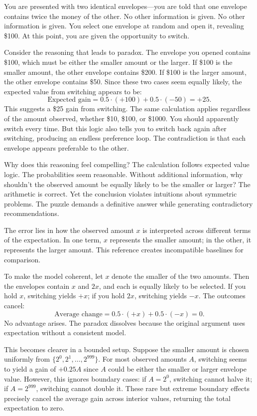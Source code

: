 You are presented with two identical envelopes—you are told that one envelope contains twice the money of the other. No other information is given. No other information is given. You select one envelope at random and open it, revealing \$100. At this point, you are given the opportunity to switch.

Consider the reasoning that leads to paradox. The envelope you opened contains \$100, which must be either the smaller amount or the larger. If \$100 is the smaller amount, the other envelope contains \$200. If \$100 is the larger amount, the other envelope contains \$50. Since these two cases seem equally likely, the expected value from switching appears to be:
\[
\text{Expected gain} = 0.5 \cdot (+100) + 0.5 \cdot (-50) = +25.
\]
This suggests a \$25 gain from switching. The same calculation applies regardless of the amount observed, whether \$10, \$100, or \$1000. You should apparently switch every time. But this logic also tells you to switch back again after switching, producing an endless preference loop. The contradiction is that each envelope appears preferable to the other.

Why does this reasoning feel compelling? The calculation follows expected value logic. The probabilities seem reasonable. Without additional information, why shouldn't the observed amount be equally likely to be the smaller or larger? The arithmetic is correct. Yet the conclusion violates intuitions about symmetric problems. The puzzle demands a definitive answer while generating contradictory recommendations.

The error lies in how the observed amount $x$ is interpreted across different terms of the expectation. In one term, $x$ represents the smaller amount; in the other, it represents the larger amount. This reference creates incompatible baselines for comparison.

To make the model coherent, let \( x \) denote the smaller of the two amounts. Then the envelopes contain \( x \) and \( 2x \), and each is equally likely to be selected. If you hold \( x \), switching yields \( +x \); if you hold \( 2x \), switching yields \( -x \). The outcomes cancel:
\[
\text{Average change} = 0.5 \cdot (+x) + 0.5 \cdot (-x) = 0.
\]
No advantage arises. The paradox dissolves because the original argument uses expectation without a consistent model.

This becomes clearer in a bounded setup. Suppose the smaller amount is chosen uniformly from \( \{2^0, 2^1, \dots, 2^{999}\} \). For most observed amounts \( A \), switching seems to yield a gain of \( +0.25A \) since \( A \) could be either the smaller or larger envelope value. However, this ignores boundary cases: if \( A = 2^0 \), switching cannot halve it; if \( A = 2^{999} \), switching cannot double it. These rare but extreme boundary effects precisely cancel the average gain across interior values, returning the total expectation to zero.

